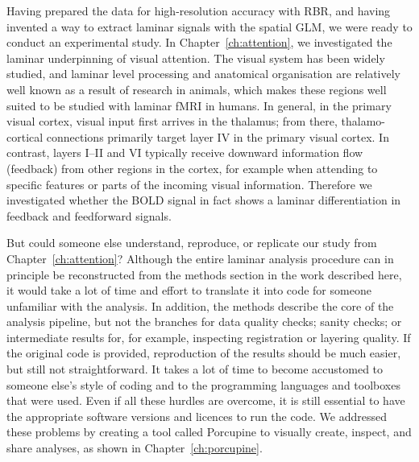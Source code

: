 Having prepared the data for high-resolution accuracy with RBR, and having invented a way to extract laminar signals with the spatial GLM, we were ready to conduct an experimental study. In Chapter~\ref{ch:attention}, we investigated the laminar underpinning of visual attention. The visual system has been widely studied, and laminar level processing and anatomical organisation are relatively well known as a result of research in animals, which makes these regions well suited to be studied with laminar fMRI in humans. In general, in the primary visual cortex, visual input first arrives in the thalamus; from there, thalamo-cortical connections primarily target layer IV in the primary visual cortex. In contrast, layers I–II and VI typically receive downward information flow (feedback) from other regions in the cortex, for example when attending to specific features or parts of the incoming visual information. Therefore we investigated whether the BOLD signal in fact shows a laminar differentiation in feedback and feedforward signals.

But could someone else understand, reproduce, or replicate our study from Chapter~\ref{ch:attention}? Although the entire laminar analysis procedure can in principle be reconstructed from the methods section in the work described here, it would take a lot of time and effort to translate it into code for someone unfamiliar with the analysis. In addition, the methods describe the core of the analysis pipeline, but not the branches for data quality checks; sanity checks; or intermediate results for, for example, inspecting registration or layering quality. If the original code is provided, reproduction of the results should be much easier, but still not straightforward. It takes a lot of time to become accustomed to someone else’s style of coding and to the programming languages and toolboxes that were used. Even if all these hurdles are overcome, it is still essential to have the appropriate software versions and licences to run the code. We addressed these problems by creating a tool called Porcupine to visually create, inspect, and share analyses, as shown in Chapter~\ref{ch:porcupine}.

